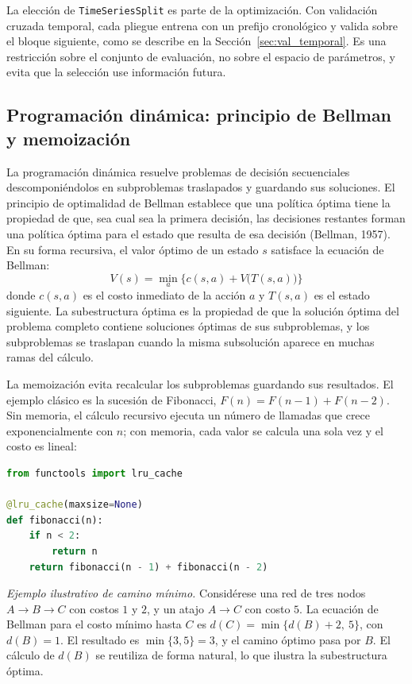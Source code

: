 La elección de \texttt{TimeSeriesSplit} es parte de la optimización. Con validación cruzada temporal, cada pliegue entrena con un prefijo cronológico y valida sobre el bloque siguiente, como se describe en la Sección~\ref{sec:val_temporal}. Es una restricción sobre el conjunto de evaluación, no sobre el espacio de parámetros, y evita que la selección use información futura.

\subsection{Programación dinámica: principio de Bellman y memoización}
La programación dinámica resuelve problemas de decisión secuenciales descomponiéndolos en subproblemas traslapados y guardando sus soluciones. El principio de optimalidad de Bellman establece que una política óptima tiene la propiedad de que, sea cual sea la primera decisión, las decisiones restantes forman una política óptima para el estado que resulta de esa decisión (Bellman, 1957). En su forma recursiva, el valor óptimo de un estado $s$ satisface la ecuación de Bellman:
\begin{equation}
V(s)=\min_{a}\Big\{c(s,a)+V\big(T(s,a)\big)\Big\}
\label{eq:bellman}
\end{equation}
donde $c(s,a)$ es el costo inmediato de la acción $a$ y $T(s,a)$ es el estado siguiente. La subestructura óptima es la propiedad de que la solución óptima del problema completo contiene soluciones óptimas de sus subproblemas, y los subproblemas se traslapan cuando la misma subsolución aparece en muchas ramas del cálculo.

La memoización evita recalcular los subproblemas guardando sus resultados. El ejemplo clásico es la sucesión de Fibonacci, $F(n)=F(n-1)+F(n-2)$. Sin memoria, el cálculo recursivo ejecuta un número de llamadas que crece exponencialmente con $n$; con memoria, cada valor se calcula una sola vez y el costo es lineal:

\begin{lstlisting}[language=Python, caption={Fibonacci con memoización mediante un caché de funciones}, label={lst:fibonacci}]
from functools import lru_cache

@lru_cache(maxsize=None)
def fibonacci(n):
    if n < 2:
        return n
    return fibonacci(n - 1) + fibonacci(n - 2)
\end{lstlisting}

\textit{Ejemplo ilustrativo de camino mínimo.} Considérese una red de tres nodos $A\to B\to C$ con costos $1$ y $2$, y un atajo $A\to C$ con costo $5$. La ecuación de Bellman para el costo mínimo hasta $C$ es $d(C)=\min\{d(B)+2,\ 5\}$, con $d(B)=1$. El resultado es $\min\{3,5\}=3$, y el camino óptimo pasa por $B$. El cálculo de $d(B)$ se reutiliza de forma natural, lo que ilustra la subestructura óptima.

